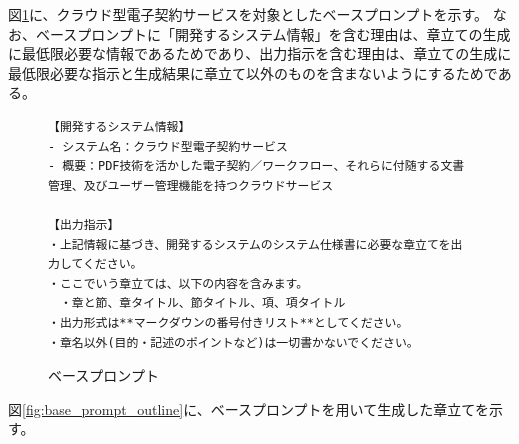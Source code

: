 図\ref{fig:base_prompt}に、クラウド型電子契約サービスを対象としたベースプロンプトを示す。
なお、ベースプロンプトに「開発するシステム情報」を含む理由は、章立ての生成に最低限必要な情報であるためであり、出力指示を含む理由は、章立ての生成に最低限必要な指示と生成結果に章立て以外のものを含まないようにするためである。

\begin{figure}[tp]
\begin{tcolorbox}[
  colback=white,
  colframe=blue,
  fonttitle=\bfseries
]
\footnotesize
\ttfamily
\fontsize{8}{9}\selectfont
\begin{verbatim}
【開発するシステム情報】
- システム名：クラウド型電子契約サービス
- 概要：PDF技術を活かした電子契約／ワークフロー、それらに付随する文書管理、及びユーザー管理機能を持つクラウドサービス

【出力指示】
・上記情報に基づき、開発するシステムのシステム仕様書に必要な章立てを出力してください。
・ここでいう章立ては、以下の内容を含みます。
　・章と節、章タイトル、節タイトル、項、項タイトル 
・出力形式は**マークダウンの番号付きリスト**としてください。 
・章名以外(目的・記述のポイントなど)は一切書かないでください。
\end{verbatim}
\end{tcolorbox}
\caption{ベースプロンプト}
\label{fig:base_prompt}
\end{figure}

図\ref{fig:base_prompt_outline}に、ベースプロンプトを用いて生成した章立てを示す。

